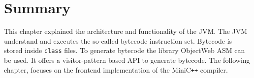 \section{Summary}

This chapter explained the architecture and functionality of the JVM. The JVM understand and executes the so-called bytecode instruction set. Bytecode is stored inside \verb|class| files. To generate bytecode the library ObjectWeb ASM can be used. It offers a visitor-pattern based API to generate bytecode. The following chapter, focuses on the frontend implementation of the MiniC\verb|++| compiler.
